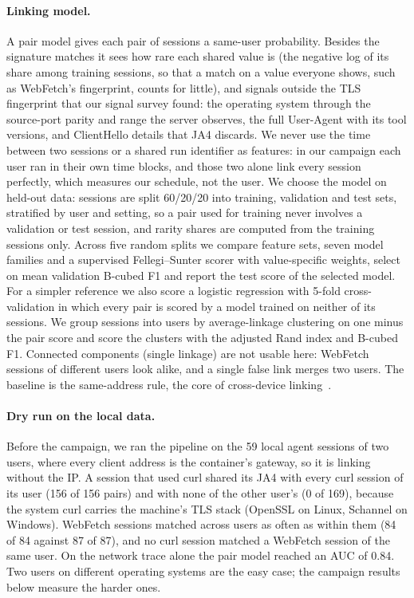 \paragraph{Linking model.} A pair model gives each pair of sessions a same-user probability. Besides the
signature matches it sees how rare each shared value is (the negative log of its share among training
sessions, so that a match on a value everyone shows, such as WebFetch's fingerprint, counts for little), and
signals outside the TLS fingerprint that our signal survey found: the operating system through the
source-port parity and range the server observes, the full User-Agent with its tool versions, and
ClientHello details that JA4 discards. We never use the time between two sessions or a shared run
identifier as features: in our campaign each user ran in their own time blocks, and those two alone link
every session perfectly, which measures our schedule, not the user. We choose the model on held-out data:
sessions are split 60/20/20 into training, validation and test sets, stratified by user and setting, so a
pair used for training never involves a validation or test session, and rarity shares are computed from
the training sessions only. Across five random splits we compare feature sets, seven model families and a
supervised Fellegi--Sunter scorer with value-specific weights, select on mean validation B-cubed F1 and
report the test score of the selected model. For a simpler reference we also score a logistic regression
with 5-fold cross-validation in which every pair is scored by a model trained on neither of its sessions.
We group sessions into users by average-linkage clustering on one minus the pair score and score the
clusters with the adjusted Rand index and B-cubed F1. Connected components (single linkage) are not usable
here: WebFetch sessions of different users look alike, and a single false link merges two users. The
baseline is the same-address rule, the core of cross-device linking~\cite{zimmeck2017crossdevice}.

\paragraph{Dry run on the local data.} Before the campaign, we ran the pipeline on the 59 local agent
sessions of two users, where every client address is the container's gateway, so it is linking without
the IP. A session that used curl shared its JA4 with every curl session of its user (156 of 156 pairs)
and with none of the other user's (0 of 169), because the system curl carries the machine's TLS stack
(OpenSSL on Linux, Schannel on Windows). WebFetch sessions matched across users as often as within them
(84 of 84 against 87 of 87), and no curl session matched a WebFetch session of the same user. On the
network trace alone the pair model reached an AUC of 0.84. Two users on different operating systems are
the easy case; the campaign results below measure the harder ones.

